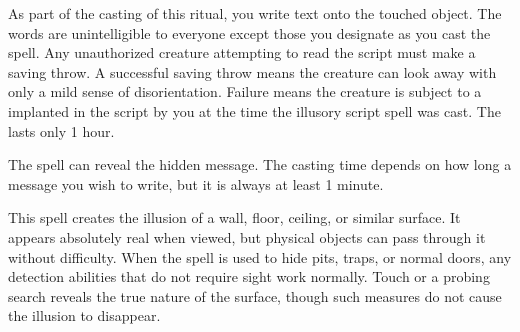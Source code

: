 \begin{spelleffect}
As part of the casting of this ritual, you write text onto the touched object. The words are unintelligible to everyone except those you designate as you cast the spell. Any unauthorized creature attempting to read the script must make a saving throw. A successful saving throw means the creature can look away with only a mild sense of disorientation. Failure means the creature is subject to a  implanted in the script by you at the time the illusory script spell was cast. The  lasts only 1 hour.
\end{spelleffect}
\begin{spellnotes}
The  spell can reveal the hidden message. The casting time depends on how long a message you wish to write, but it is always at least 1 minute.
\end{spellnotes}

\spellrng{\rngclose}
\begin{spelleffect}
This spell creates the illusion of a wall, floor, ceiling, or similar surface. It appears absolutely real when viewed, but physical objects can pass through it without difficulty. When the spell is used to hide pits, traps, or normal doors, any detection abilities that do not require sight work normally. Touch or a probing search reveals the true nature of the surface, though such measures do not cause the illusion to disappear.
\end{spelleffect}

